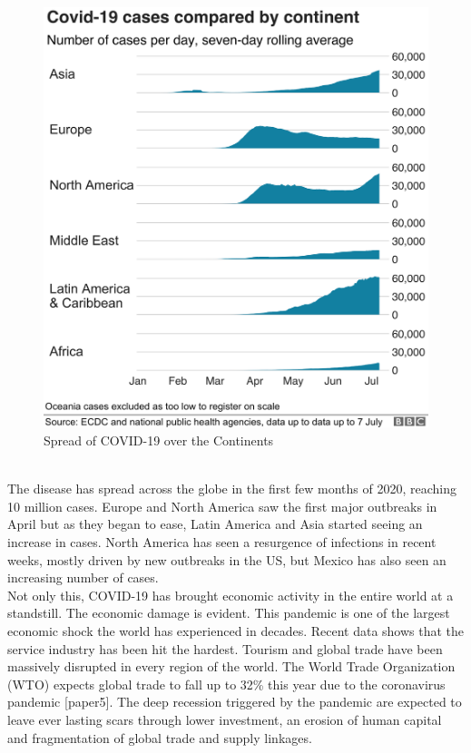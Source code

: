 \documentclass[12pt]{revtex4}
\begin{document}
\begin{figure}[htp]
    \centering
    \includegraphics[width=16cm]{CNN_World.png}
    \caption{Spread of COVID-19 over the Continents}
    \label{fig:def}
\end{figure}
\\The disease has spread across the globe in the first few months of 2020, reaching 10 million cases. Europe and North America saw the first major outbreaks in April but as they began to ease, Latin America and Asia started seeing an increase in cases. North America has seen a resurgence of infections in recent weeks, mostly driven by new outbreaks in the US, but Mexico has also seen an increasing number of cases.
\\Not only this, COVID-19 has brought economic activity in the entire world at a standstill. The economic damage is evident. This pandemic is one of the largest economic shock the world has experienced in decades. Recent data shows that the service industry has been hit the hardest. Tourism and global trade have been massively disrupted in every region of the world. The World Trade Organization (WTO) expects global trade to fall up to 32\% this year due to the coronavirus pandemic [paper5]. The deep recession triggered by the pandemic are expected to leave ever lasting scars through lower investment, an erosion of human capital and fragmentation of global trade and supply linkages. 
\end{document}
